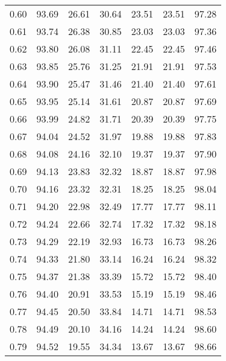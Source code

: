 \begin{tabular}{|c|c|c|c|c|c|c|}
      0.60 &     93.69 &     26.61 &      30.64 &   23.51 &      23.51 &         97.28 \\
      0.61 &     93.74 &     26.38 &      30.85 &   23.03 &      23.03 &         97.36 \\
      0.62 &     93.80 &     26.08 &      31.11 &   22.45 &      22.45 &         97.46 \\
      0.63 &     93.85 &     25.76 &      31.25 &   21.91 &      21.91 &         97.53 \\
      0.64 &     93.90 &     25.47 &      31.46 &   21.40 &      21.40 &         97.61 \\
      0.65 &     93.95 &     25.14 &      31.61 &   20.87 &      20.87 &         97.69 \\
      0.66 &     93.99 &     24.82 &      31.71 &   20.39 &      20.39 &         97.75 \\
      0.67 &     94.04 &     24.52 &      31.97 &   19.88 &      19.88 &         97.83 \\
      0.68 &     94.08 &     24.16 &      32.10 &   19.37 &      19.37 &         97.90 \\
      0.69 &     94.13 &     23.83 &      32.32 &   18.87 &      18.87 &         97.98 \\
      0.70 &     94.16 &     23.32 &      32.31 &   18.25 &      18.25 &         98.04 \\
      0.71 &     94.20 &     22.98 &      32.49 &   17.77 &      17.77 &         98.11 \\
      0.72 &     94.24 &     22.66 &      32.74 &   17.32 &      17.32 &         98.18 \\
      0.73 &     94.29 &     22.19 &      32.93 &   16.73 &      16.73 &         98.26 \\
      0.74 &     94.33 &     21.80 &      33.14 &   16.24 &      16.24 &         98.32 \\
      0.75 &     94.37 &     21.38 &      33.39 &   15.72 &      15.72 &         98.40 \\
      0.76 &     94.40 &     20.91 &      33.53 &   15.19 &      15.19 &         98.46 \\
      0.77 &     94.45 &     20.50 &      33.84 &   14.71 &      14.71 &         98.53 \\
      0.78 &     94.49 &     20.10 &      34.16 &   14.24 &      14.24 &         98.60 \\
      0.79 &     94.52 &     19.55 &      34.34 &   13.67 &      13.67 &         98.66 \\

\end{tabular}
